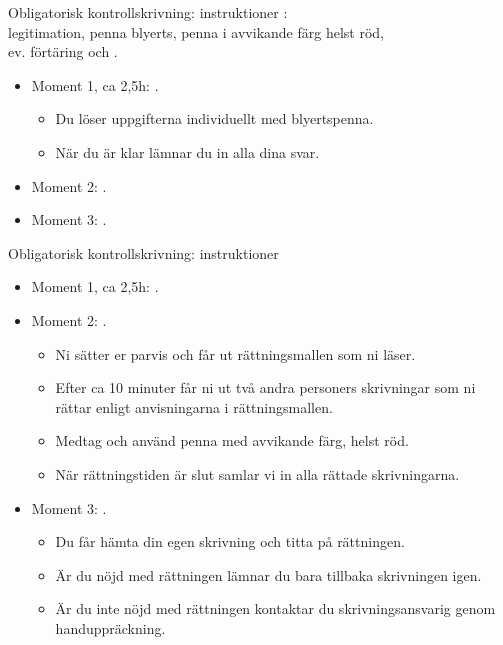 \begin{Slide}{Obligatorisk kontrollskrivning: instruktioner}
: \\ legitimation, penna blyerts, penna i avvikande färg helst röd, \\ ev. förtäring och .

\vspace{2em}\begin{itemize}
\item Moment 1, ca 2,5h: . 
\begin{itemize} 
\item Du löser uppgifterna individuellt med blyertspenna. 
\item När du är klar lämnar du in alla dina svar. 
\end{itemize}
\item Moment  2: .
\item Moment 3: .
\end{itemize}
\end{Slide}

\begin{Slide}{Obligatorisk kontrollskrivning: instruktioner}
\begin{itemize}
\item Moment 1, ca 2,5h: . 
 
\item Moment  2: . 
\begin{itemize}

\item
Ni  sätter  er  parvis  och  får  ut  rättningsmallen  som  ni läser. 

\item Efter  ca  10  minuter  får  ni  ut  två andra  personers  skrivningar  som  ni  rättar enligt  anvisningarna  i  rättningsmallen.  

\item Medtag och använd penna med avvikande färg, helst röd.

\item När  rättningstiden  är  slut  samlar  vi in alla rättade skrivningarna.
\end{itemize}
\pause
\item Moment 3: . 
\begin{itemize}
\item Du får hämta din egen skrivning och titta på rättningen. 
\item Är  du  nöjd  med  rättningen  lämnar  du  bara tillbaka  skrivningen igen. 
\item Är du inte nöjd med rättningen kontaktar du skrivningsansvarig genom handuppräckning.
\end{itemize}
\end{itemize}
\end{Slide}

